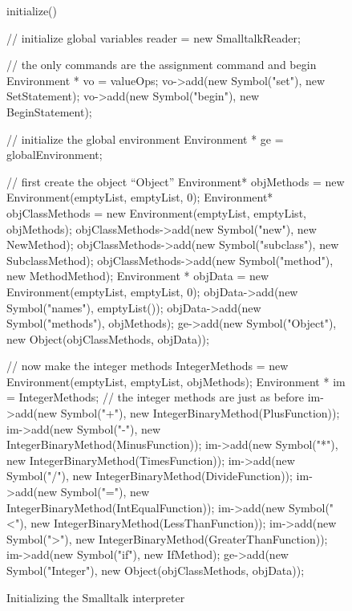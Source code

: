 \begin{figure}
\begin{cprog}
initialize()
{
	// initialize global variables
	reader = new SmalltalkReader;

	// the only commands are the assignment command  and begin
	Environment * vo = valueOps;
	vo->add(new Symbol("set"), new SetStatement);
	vo->add(new Symbol("begin"), new BeginStatement);

	// initialize the global environment
	Environment * ge = globalEnvironment;

	// first create the object ``Object''
	Environment* objMethods = new Environment(emptyList, emptyList, 0);
	Environment* objClassMethods = new Environment(emptyList, emptyList,
				objMethods);
	objClassMethods->add(new Symbol("new"), new NewMethod);
	objClassMethods->add(new Symbol("subclass"), new SubclassMethod);
	objClassMethods->add(new Symbol("method"), new MethodMethod);
	Environment * objData = new Environment(emptyList, emptyList, 0);
	objData->add(new Symbol("names"), emptyList());
	objData->add(new Symbol("methods"), objMethods);
	ge->add(new Symbol("Object"), 
			new Object(objClassMethods, objData));

	// now make the integer methods
	IntegerMethods = new Environment(emptyList, emptyList, objMethods);
	Environment * im = IntegerMethods;
	// the integer methods are just as before
	im->add(new Symbol("+"), new IntegerBinaryMethod(PlusFunction));
	im->add(new Symbol("-"), new IntegerBinaryMethod(MinusFunction));
	im->add(new Symbol("*"), new IntegerBinaryMethod(TimesFunction));
	im->add(new Symbol("/"), new IntegerBinaryMethod(DivideFunction));
	im->add(new Symbol("="), new IntegerBinaryMethod(IntEqualFunction));
	im->add(new Symbol("<"), new IntegerBinaryMethod(LessThanFunction));
	im->add(new Symbol(">"), new IntegerBinaryMethod(GreaterThanFunction));
	im->add(new Symbol("if"), new IfMethod);
	ge->add(new Symbol("Integer"),
			new Object(objClassMethods, objData));
}
\end{cprog}
\caption{Initializing the Smalltalk interpreter}
\end{figure}

